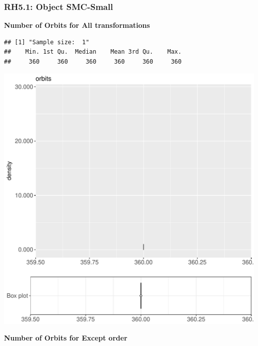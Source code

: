 \documentclass{article}\usepackage[]{graphicx}\usepackage[]{color}
\makeatletter
\def\maxwidth{ %
  \ifdim\Gin@nat@width>\linewidth
    \linewidth
  \else
    \Gin@nat@width
  \fi
}
\newenvironment{kframe}{%
 \def\at@end@of@kframe{}%
 \ifinner\ifhmode%
  \def\at@end@of@kframe{\end{minipage}}%
  \begin{minipage}{\columnwidth}%
 \fi\fi%
 \def\FrameCommand##1{\hskip\@totalleftmargin \hskip-\fboxsep
 \colorbox{shadecolor}{##1}\hskip-\fboxsep
     \hskip-\linewidth \hskip-\@totalleftmargin \hskip\columnwidth}%
 \MakeFramed {\advance\hsize-\width
   \@totalleftmargin\z@ \linewidth\hsize
   \@setminipage}}%
 {\par\unskip\endMakeFramed%
 \at@end@of@kframe}
\newenvironment{knitrout}{}{} %
\makeatother
\begin{document}
\subsubsection{RH5.1: Object SMC-Small}

 \textbf{Number of Orbits for All transformations}
\begin{knitrout}
\color{fgcolor}\begin{kframe}
\begin{verbatim}
## [1] "Sample size:  1"
##    Min. 1st Qu.  Median    Mean 3rd Qu.    Max. 
##     360     360     360     360     360     360
\end{verbatim}


{\ttfamily\noindent\bfseries{}}\end{kframe}
\includegraphics[width=\maxwidth]{figure/RH5_cashew_small-1} 

\end{knitrout}
 \textbf{Number of Orbits for Except order}
\end{document}
